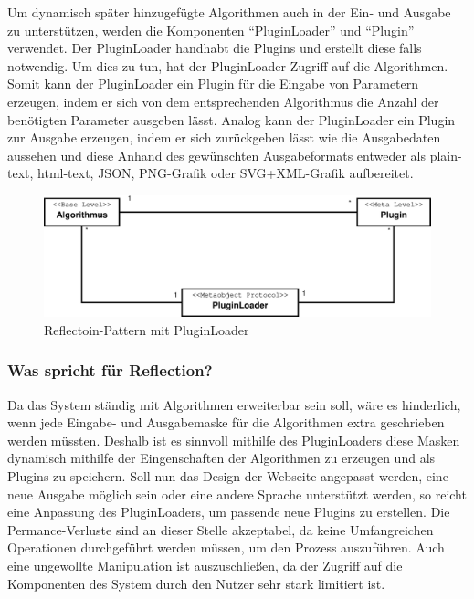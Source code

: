 Um dynamisch später hinzugefügte Algorithmen auch in der Ein- und Ausgabe zu unterstützen, werden die Komponenten "`PluginLoader"' und "`Plugin"' verwendet. Der PluginLoader handhabt die Plugins und erstellt diese falls notwendig. Um dies zu tun, hat der PluginLoader Zugriff auf die Algorithmen. Somit kann der PluginLoader ein Plugin für die Eingabe von Parametern erzeugen, indem er sich von dem entsprechenden Algorithmus die Anzahl der benötigten Parameter ausgeben lässt. Analog kann der PluginLoader ein Plugin zur Ausgabe erzeugen, indem er sich zurückgeben lässt wie die Ausgabedaten aussehen und diese Anhand des gewünschten Ausgabeformats entweder als plain-text, html-text, JSON, PNG-Grafik oder SVG+XML-Grafik aufbereitet.\\

\begin{figure}[h]
\centering
	\vspace{-5pt}
\includegraphics[width=0.7\linewidth]{Grafik/Diagramm/Reflection}
\caption[Reflection-Klasse]{Reflectoin-Pattern mit PluginLoader}
\label{fig:Reflection}
\end{figure}
\subsubsection{Was spricht für Reflection?}
Da das System ständig mit Algorithmen erweiterbar sein soll, wäre es hinderlich, wenn jede Eingabe- und Ausgabemaske für die Algorithmen extra geschrieben werden müssten. Deshalb ist es sinnvoll mithilfe des PluginLoaders diese Masken dynamisch mithilfe der Eingenschaften der Algorithmen zu erzeugen und als Plugins zu speichern. Soll nun das Design der Webseite angepasst werden, eine neue Ausgabe möglich sein oder eine andere Sprache unterstützt werden, so reicht eine Anpassung des PluginLoaders, um passende neue Plugins zu erstellen. Die Permance-Verluste sind an dieser Stelle akzeptabel, da keine Umfangreichen Operationen durchgeführt werden müssen, um den Prozess auszuführen. Auch eine ungewollte Manipulation ist auszuschließen, da der Zugriff auf die Komponenten des System durch den Nutzer sehr stark limitiert ist.

